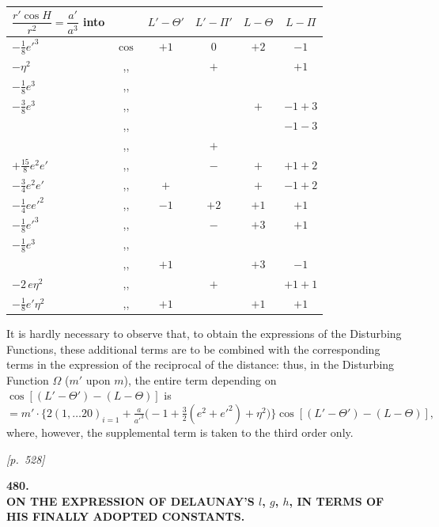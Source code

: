 \documentclass[11pt]{article}
\begin{document}
\begin{center}
\begin{tabular}{|l|c|c|c|c|c|}
\hline
$\dfrac{r'\cos H}{r^2}=\dfrac{a'}{a^3}$ into & & $L'-\Theta'$ & $L'-\Pi'$ & $L-\Theta$ & $L-\Pi$ \\
\hline
$-\tfrac{1}{8}e'^3$ & $\cos$ & $+1$ & $0$ & $+2$ & $-1$ \\
$-\eta^2$ & ,, & & $+$ & & $+1$ \\
$-\tfrac{1}{8}e^3$ & ,, & & & & \\
$-\tfrac{3}{8}e^3$ & ,, & & & $+$ & $-1+3$ \\
 & ,, & & & & $-1-3$ \\
 & ,, & & $+$ & & \\
$+\tfrac{15}{8}e^2e'$ & ,, & & $-$ & $+$ & $+1+2$ \\
$-\tfrac{3}{4}e^2e'$ & ,, & $+$ & & $+$ & $-1+2$ \\
$-\tfrac{1}{4}ee'^2$ & ,, & $-1$ & $+2$ & $+1$ & $+1$ \\
$-\tfrac{1}{8}e'^3$ & ,, & & $-$ & $+3$ & $+1$ \\
$-\tfrac{1}{8}e^3$ & ,, & & & & \\
 & ,, & $+1$ & & $+3$ & $-1$ \\
$-2\,e\eta^2$ & ,, & & $+$ & & $+1+1$ \\
$-\tfrac{1}{8}e'\eta^2$ & ,, & $+1$ & & $+1$ & $+1$ \\
\hline
\end{tabular}
\end{center}

\medskip

It is hardly necessary to observe that, to obtain the expressions of the
Disturbing Functions, these additional terms are to be combined with the
corresponding terms in the expression of the reciprocal of the distance:
thus, in the Disturbing Function $\Omega$ ($m'$ upon $m$), the entire
term depending on $\cos[(L'-\Theta')-(L-\Theta)]$ is
\[
=m'\cdot\{2(1,\ldots20)_{i=1}+\tfrac{a}{a'^3}\bigl(-1+\tfrac{3}{2}(e^2+e'^2)+\eta^2\bigr)\}\cos[(L'-\Theta')-(L-\Theta)],
\]
where, however, the supplemental term is taken to the third order only.


\newpage
\noindent\textit{[p.~528]}

\bigskip

\begin{center}
\textbf{\large 480.}\\[6pt]
\textbf{\Large ON THE EXPRESSION OF DELAUNAY'S $l$, $g$, $h$, IN TERMS OF}\\
\textbf{\Large HIS FINALLY ADOPTED CONSTANTS.}
\end{center}
\end{document}
